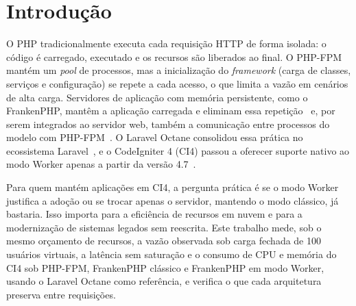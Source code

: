 \documentclass[sigconf, nonacm, screen, language=portuguese, language=spanish, language={main=english}]{acmart}
\begin{document}
\maketitle
{}
\section{Introdução}
O PHP tradicionalmente executa cada requisição HTTP de forma isolada: o código é carregado, executado e os recursos são liberados ao final. O PHP-FPM mantém um \textit{pool} de processos, mas a inicialização do \textit{framework} (carga de classes, serviços e configuração) se repete a cada acesso, o que limita a vazão em cenários de alta carga. Servidores de aplicação com memória persistente, como o FrankenPHP, mantêm a aplicação carregada e eliminam essa repetição~\cite{dungalas2024} e, por serem integrados ao servidor web, também a comunicação entre processos do modelo com PHP-FPM~\cite{dhaniswara2025}. O Laravel Octane consolidou essa prática no ecossistema Laravel~\cite{otwell2024}, e o CodeIgniter 4 (CI4) passou a oferecer suporte nativo ao modo Worker apenas a partir da versão 4.7~\cite{codeigniter2024}.

Para quem mantém aplicações em CI4, a pergunta prática é se o modo Worker justifica a adoção ou se trocar apenas o servidor, mantendo o modo clássico, já bastaria. Isso importa para a eficiência de recursos em nuvem e para a modernização de sistemas legados sem reescrita. Este trabalho mede, sob o mesmo orçamento de recursos, a vazão observada sob carga fechada de 100 usuários virtuais, a latência sem saturação e o consumo de CPU e memória do CI4 sob PHP-FPM, FrankenPHP clássico e FrankenPHP em modo Worker, usando o Laravel Octane como referência, e verifica o que cada arquitetura preserva entre requisições.
\end{document}
